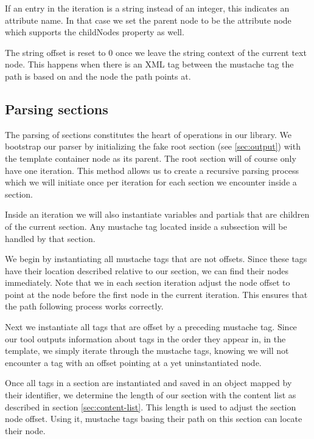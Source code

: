 If an entry in the iteration is a string instead of an integer, this indicates
an attribute name. In that case we set the parent node to be the attribute node
which supports the childNodes property as well.

The string offset is reset to 0 once we leave the string context of the
current text node. This happens when there is an XML tag between the
mustache tag the path is based on and the node the path points at.

\subsection{Parsing sections}
The parsing of sections constitutes the heart of operations in our library.
We bootstrap our parser by initializing the fake root section
(see \ref{sec:output}) with the template container node as its parent.
The root section will of course only have one iteration.
This method allows us to create a recursive parsing process which we will
initiate once per iteration for each section we encounter inside a section.

Inside an iteration we will also instantiate variables and partials that are
children of the current section. Any mustache tag located inside a subsection
will be handled by that section.

We begin by instantiating all mustache tags that are not offsets. Since these
tags have their location described relative to our section, we can find their
nodes immediately. Note that we in each section iteration adjust the node offset
to point at the node before the first node in the current iteration.
This ensures that the path following process works correctly.

Next we instantiate all tags that are offset by a preceding mustache tag.
Since our tool outputs information about tags in the order they appear in, in the
template, we simply iterate through the mustache tags, knowing we will not
encounter a tag with an offset pointing at a yet uninstantiated node.


Once all tags in a section are instantiated and saved in an object mapped by
their identifier, we determine the length of our section with the content list
as described in section \ref{sec:content-list}. This length is used to adjust
the section node offset. Using it, mustache tags basing their path on this
section can locate their node.

